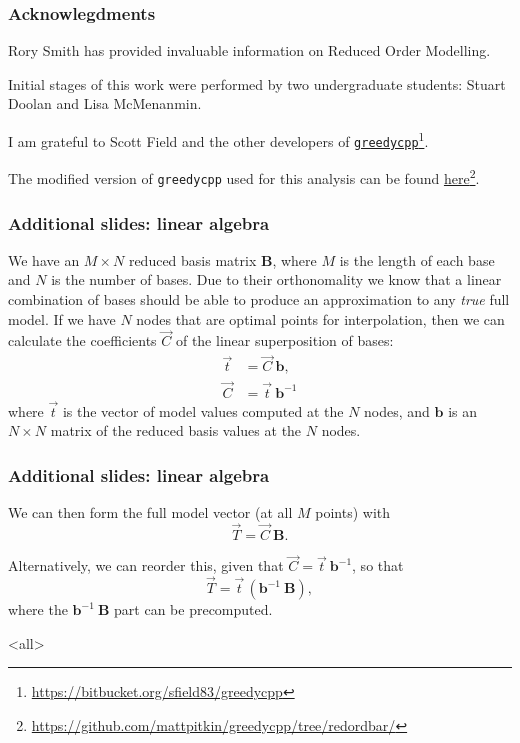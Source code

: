 \begin{frame}

\frametitle{Acknowlegdments}
\label{acknowlegdments}

Rory Smith has provided invaluable information on Reduced Order Modelling.

Initial stages of this work were performed by two undergraduate students: Stuart Doolan
and Lisa McMenanmin.

I am grateful to Scott Field and the other developers of \href{https://bitbucket.org/sfield83/greedycpp}{\texttt{greedycpp}}\footnote{\href{https://bitbucket.org/sfield83/greedycpp}{https:/\slash bitbucket.org\slash sfield83\slash greedycpp}}.

The modified version of \texttt{greedycpp} used for this analysis can be found \href{https://github.com/mattpitkin/greedycpp/tree/redordbar/}{here}\footnote{\href{https://github.com/mattpitkin/greedycpp/tree/redordbar/}{https:/\slash github.com\slash mattpitkin\slash greedycpp\slash tree\slash redordbar\slash }}.

\end{frame}

\begin{frame}

\frametitle{Additional slides: linear algebra}
\label{additionalslides:linearalgebra}

We have an $M \times N$ reduced basis matrix $\mathbf{B}$, where $M$ is the length of each base and $N$ is the number of bases.
Due to their orthonomality we know that a linear combination of bases should be able to produce an approximation to any \emph{true}
full model. If we have $N$ nodes that are optimal points for interpolation, then we can calculate the coefficients $\vec{C}$ of the
linear superposition of bases:
 \begin{align}
\vec{t} &= \vec{C}~\mathbf{b}, \nonumber \\
\vec{C} &= \vec{t}~\mathbf{b}^{-1} \nonumber
\end{align} 
where $\vec{t}$ is the vector of model values computed at the $N$ nodes, and $\mathbf{b}$ is an $N \times N$ matrix of the reduced
basis values at the $N$ nodes.

\end{frame}

\begin{frame}

\frametitle{Additional slides: linear algebra}
\label{additionalslides:linearalgebra}

We can then form the full model vector (at all $M$ points) with
\[
\vec{T} = \vec{C}~\mathbf{B}.
\]

Alternatively, we can reorder this, given that $\vec{C} = \vec{t}~\mathbf{b}^{-1}$, so that
\[
\vec{T} = \vec{t}\,(\mathbf{b}^{-1}~\mathbf{B}),
\]
where the $\mathbf{b}^{-1}~\mathbf{B}$ part can be precomputed.

\end{frame}

\mode<all>


\mode*


